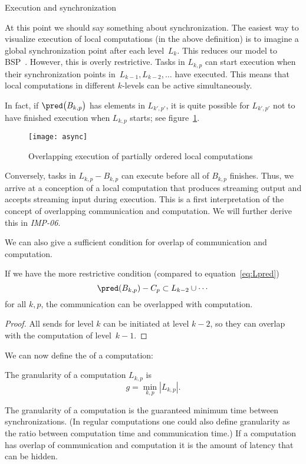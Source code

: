  {Execution and synchronization}

At this point we should say something about synchronization.
The easiest way to visualize execution of local computations (in the above
definition) is to imagine a global synchronization point after each level~$L_k$.
This reduces our model to \ac{BSP}~\cite{Valiant:1990:BSP}. However, this is overly restrictive.
Tasks in $L_{k,p}$ can start execution when their synchronization points in~$L_{k-1},L_{k-2},\ldots$
have executed. This means that local computations in different $k$-levels can be
active simultaneously.

In fact, if $\pred\bigl(B_{k,p}\bigr)$ has elements in $L_{k',p'}$, it is quite
possible for $L_{k',p'}$ not to have finished execution when $L_{k,p}$ starts;
see figure~\ref{fig:asyncL}.
\begin{figure}[t]
  \texttt{[image: async]}
  \caption{Overlapping execution of partially ordered local computations}
  \label{fig:asyncL}
\end{figure}
Conversely, tasks in $L_{k,p}-B_{k,p}$ can execute before all of $B_{k,p}$
finishes. Thus, we arrive at a conception of a local computation that produces
streaming output and accepts streaming input during execution. This is a first 
interpretation of the concept of overlapping communication and computation.
We will further derive this in \emph{IMP-06}.

We can also give a sufficient condition for overlap of communication and computation.
\begin{theorem}
  If we have the more restrictive condition (compared to equation~\eqref{eq:Lpred})
  \[ \pred(B_{k,p})-C_p\subset L_{k-2}\cup \cdots \]
  for all $k,p$, the communication can be overlapped with computation.
\end{theorem}
\begin{proof}
  All sends for level $k$ can be initiated at level $k-2$, so they can overlap
  with the computation of level~$k-1$.
\end{proof}

We can now define the  of a computation:
\begin{definition}
  The granularity of a computation $L_{k,p}$ is
  \[ g = \min_{k,p} |L_{k,p}|. \]
\end{definition}

The granularity of a computation is the guaranteed minimum time
between synchronizations.  (In regular computations one could also
define granularity as the ratio between computation time and
communication time.)  If a computation has overlap of communication
and computation it is the amount of latency that can be hidden.

